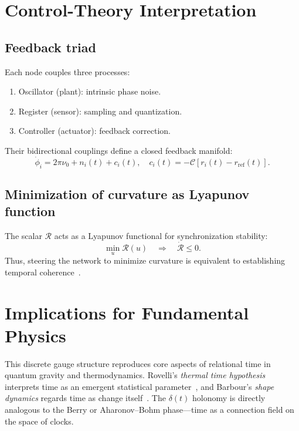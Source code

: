 \documentclass[11pt,a4paper]{article}
\begin{document}
\section{Control-Theory Interpretation}

\subsection{Feedback triad}
Each node couples three processes:
\begin{enumerate}
\item Oscillator (plant): intrinsic phase noise.
\item Register (sensor): sampling and quantization.
\item Controller (actuator): feedback correction.
\end{enumerate}
Their bidirectional couplings define a closed feedback manifold:
\begin{equation}
\dot{\phi}_i = 2\pi\nu_0 + n_i(t) + c_i(t), \quad
c_i(t) = -\mathcal{C}[r_i(t)-r_\mathrm{ref}(t)].
\end{equation}

\subsection{Minimization of curvature as Lyapunov function}
The scalar $\mathcal{R}$ acts as a Lyapunov functional for synchronization stability:
\begin{equation}
\min_u \mathcal{R}(u) \quad \Rightarrow \quad \dot{\mathcal{R}} \le 0.
\end{equation}
Thus, steering the network to minimize curvature is equivalent to establishing temporal coherence~\citep{Astrom2008}.

\section{Implications for Fundamental Physics}
This discrete gauge structure reproduces core aspects of relational time in quantum gravity and thermodynamics. 
Rovelli's \emph{thermal time hypothesis} interprets time as an emergent statistical parameter~\citep{Rovelli1993}, and Barbour's \emph{shape dynamics} regards time as change itself~\citep{Barbour1999}. 
The $\delta(t)$ holonomy is directly analogous to the Berry or Aharonov–Bohm phase—time as a connection field on the space of clocks.
\end{document}
